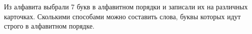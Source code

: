 \question
Из алфавита выбрали 7 букв в алфавитном порядки и записали их на различных  карточках. Сколькими способами можно составить слова, буквы которых идут строго в алфавитном порядке.
